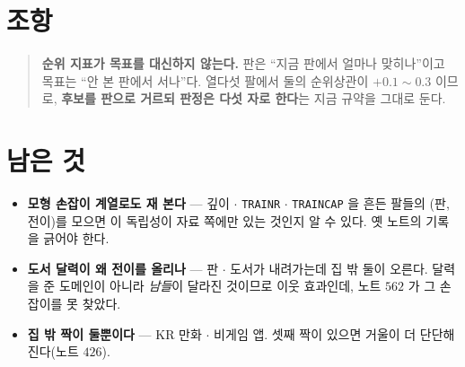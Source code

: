 \documentclass[11pt]{article}
\begin{document}
\section*{조항}

\begin{quote}
\textbf{순위 지표가 목표를 대신하지 않는다.} 판은 ``지금 판에서 얼마나
맞히나''이고 목표는 ``안 본 판에서 서나''다. 열다섯 팔에서 둘의 순위상관이
$+0.1\!\sim\!0.3$ 이므로, \textbf{후보를 판으로 거르되 판정은 다섯 자로
한다}는 지금 규약을 그대로 둔다.
\end{quote}

\section*{남은 것}

\begin{itemize}
\item \textbf{모형 손잡이 계열로도 재 본다} --- 깊이 $\cdot$ \texttt{TRAINR}
$\cdot$ \texttt{TRAINCAP} 을 흔든 팔들의 (판, 전이)를 모으면 이 독립성이
자료 쪽에만 있는 것인지 알 수 있다. 옛 노트의 기록을 긁어야 한다.
\item \textbf{도서 달력이 왜 전이를 올리나} --- 판 $\cdot$ 도서가 내려가는데
집 밖 둘이 오른다. 달력을 준 도메인이 아니라 \emph{남들}이 달라진 것이므로
이웃 효과인데, 노트 $562$ 가 그 손잡이를 못 찾았다.
\item \textbf{집 밖 짝이 둘뿐이다} --- KR 만화 $\cdot$ 비게임 앱. 셋째 짝이
있으면 거울이 더 단단해진다(노트 $426$).
\end{itemize}
\end{document}
